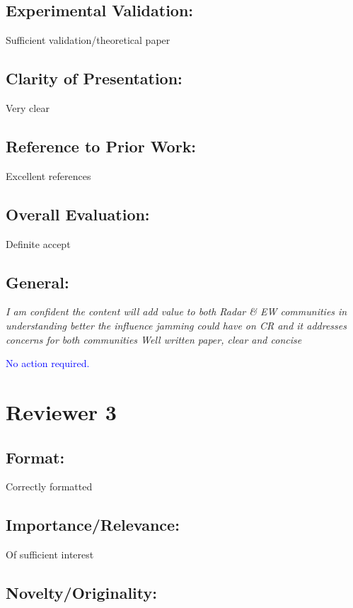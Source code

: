 \documentclass[11pt]{amsart}
\begin{document}
\subsection{Experimental Validation:}
 Sufficient validation/theoretical paper

\subsection{Clarity of Presentation:}

 Very clear

\subsection{Reference to Prior Work:}

 Excellent references

\subsection{Overall Evaluation:}

 Definite accept

\subsection{General:}

\emph{I am confident the content will add value to both Radar \& EW communities in understanding better the influence jamming could have on CR and it addresses concerns for both communities Well written paper, clear and concise}

\textcolor{blue}{
No action required.}


\section{Reviewer 3}

\subsection{Format: }
Correctly formatted

\subsection{Importance/Relevance:}

 Of sufficient interest

\subsection{Novelty/Originality:}
\end{document}
